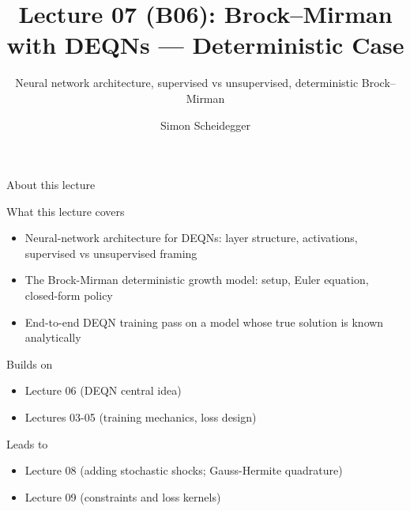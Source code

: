 \documentclass[aspectratio=169,11pt]{beamer}
\title[Lecture 07 (B06)]{Lecture 07 (B06): Brock--Mirman with DEQNs --- Deterministic Case}
\subtitle{Neural network architecture, supervised vs unsupervised, deterministic Brock--Mirman}
\author{Simon Scheidegger}
\institute{HEC, University of Lausanne}
\date{}
\begin{document}
\providecommand{\exercisepause}{%
  \tikz[baseline=(X.base)]{\node[fill=darkgreen!80!black, text=white,
  rounded corners=2pt, inner sep=3pt, font=\scriptsize\bfseries](X){PAUSE};}}

{
\begin{frame}
\titlepage
\end{frame}
}

\begin{frame}{About this lecture}
\small
\begin{block}{What this lecture covers}
\begin{itemize}\itemsep2pt
  \item Neural-network architecture for DEQNs: layer structure, activations, supervised vs unsupervised framing
  \item The Brock-Mirman deterministic growth model: setup, Euler equation, closed-form policy
  \item End-to-end DEQN training pass on a model whose true solution is known analytically
\end{itemize}
\end{block}
\begin{block}{Builds on}
\begin{itemize}\itemsep2pt
  \item Lecture 06 (DEQN central idea)
  \item Lectures 03-05 (training mechanics, loss design)
\end{itemize}
\end{block}
\begin{block}{Leads to}
\begin{itemize}\itemsep2pt
  \item Lecture 08 (adding stochastic shocks; Gauss-Hermite quadrature)
  \item Lecture 09 (constraints and loss kernels)
\end{itemize}
\end{block}
\end{frame}
\end{document}
